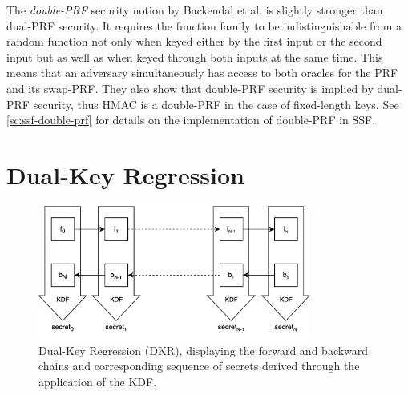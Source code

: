 The \textit{double-PRF} security notion by Backendal et al.
is slightly stronger than dual-PRF security.
It requires the function family to be indistinguishable from a random 
function not only when keyed either by the first input or the second input
but as well as when keyed through both inputs at the same time.
This means that an adversary simultaneously has access to both 
oracles for the PRF and its swap-PRF.
They also show that double-PRF security is implied by dual-PRF security,
thus HMAC is a double-PRF in the case of fixed-length keys.
See \cref{sc:ssf-double-prf} for details on the implementation of double-PRF in SSF.

\section{Dual-Key Regression}\label{sc:DKR}

\begin{figure}
    \centering
    \includegraphics[width=0.8\textwidth]{figures/dkr.drawio.png}
    \caption{Dual-Key Regression (DKR), displaying the forward and backward chains and corresponding sequence of secrets derived through the application of the KDF. }
    \label{fig:dkr}
\end{figure}

